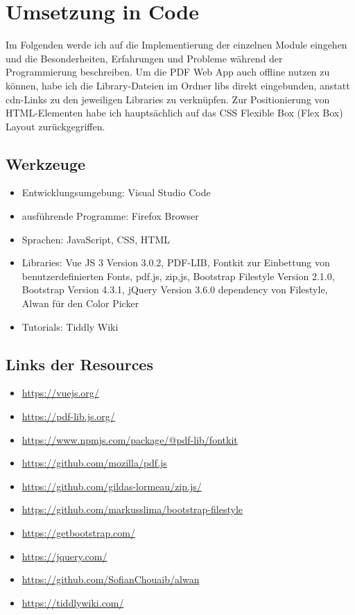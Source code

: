 \section{Umsetzung in Code}
Im Folgenden werde ich auf die Implementierung der einzelnen Module eingehen und die Besonderheiten, Erfahrungen und Probleme während der Programmierung beschreiben. Um die PDF Web App auch offline nutzen zu können, habe ich die Library-Dateien im Ordner libs direkt eingebunden, anstatt \gls{cdn}-Links zu den jeweiligen Libraries zu verknüpfen. Zur Positionierung von HTML-Elementen habe ich hauptsächlich auf das CSS Flexible Box (Flex Box) Layout zurückgegriffen. 

\subsection{Werkzeuge}
\begin{itemize}
	\item Entwicklungsumgebung: Visual Studio Code
	\item ausführende Programme: Firefox Browser
	\item Sprachen: JavaScript, CSS, HTML
	\item Libraries: Vue JS 3 Version 3.0.2, PDF-LIB, Fontkit zur Einbettung von benutzerdefinierten Fonts, pdf.js, zip,js, Bootstrap Filestyle Version 2.1.0, Bootstrap Version 4.3.1, jQuery Version 3.6.0 dependency von Filestyle, Alwan für den Color Picker
	\item Tutorials: Tiddly Wiki
\end{itemize}

\subsection{Links der Resources}
\begin{itemize}
	\item \url{https://vuejs.org/}
	\item \url{https://pdf-lib.js.org/}
	\item \url{https://www.npmjs.com/package/@pdf-lib/fontkit}
	\item \url{https://github.com/mozilla/pdf.js}
	\item \url{https://github.com/gildas-lormeau/zip.js/}
	\item \url{https://github.com/markusslima/bootstrap-filestyle}
	\item \url{https://getbootstrap.com/}
	\item \url{https://jquery.com/}
	\item \url{https://github.com/SofianChouaib/alwan}
	\item \url{https://tiddlywiki.com/}
\end{itemize}

